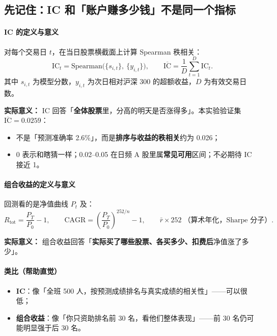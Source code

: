 \documentclass[UTF8,a4paper,12pt]{ctexart}
\begin{document}
\subsection{先记住：IC 和「账户赚多少钱」不是同一个指标}

\paragraph{IC 的定义与意义}

对每个交易日 $t$，在当日股票横截面上计算 Spearman 秩相关：
\begin{equation}
  \mathrm{IC}_t = \mathrm{Spearman}\big(\{s_{i,t}\},\ \{y_{i,t}\}\big),
  \qquad
  \overline{\mathrm{IC}} = \frac{1}{D}\sum_{t=1}^{D}\mathrm{IC}_t.
\end{equation}
其中 $s_{i,t}$ 为模型分数，$y_{i,t}$ 为次日相对沪深 300 的超额收益，$D$ 为有效交易日数。

\textbf{实际意义：} IC 回答「\textbf{全体股票}里，分高的明天是否涨得多」。本实验验证集 $\overline{\mathrm{IC}}=0.0259$：
\begin{itemize}[leftmargin=2em]
  \item 不是「预测准确率 2.6\%」，而是\textbf{排序与收益的秩相关}约为 0.026；
  \item 0 表示和瞎猜一样；0.02--0.05 在日频 A 股里属\textbf{常见可用}区间；不必期待 IC 接近 1。
\end{itemize}

\paragraph{组合收益的定义与意义}

回测看的是净值曲线 $P_t$ 及：
\begin{equation}
  R_{\mathrm{tot}} = \frac{P_T}{P_0}-1,
  \qquad
  \mathrm{CAGR} = \left(\frac{P_T}{P_0}\right)^{252/n}-1,
  \qquad
  \bar{r}\times 252 \;\text{（算术年化，Sharpe 分子）}.
\end{equation}

\textbf{实际意义：} 组合收益回答「\textbf{实际买了哪些股票、各买多少、扣费后}净值涨了多少」。

\paragraph{类比（帮助直觉）}

\begin{itemize}[leftmargin=2em]
  \item \textbf{IC}：像「全班 500 人，按预测成绩排名与真实成绩的相关性」——可以很低；
  \item \textbf{组合收益}：像「你只资助排名前 30 名，看他们整体表现」——前 30 名仍可能明显强于后 30 名。
\end{itemize}
\end{document}
